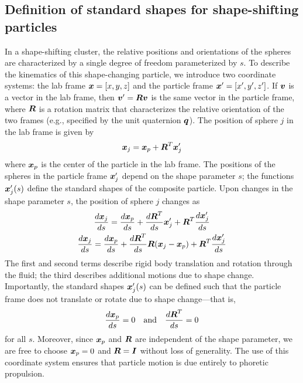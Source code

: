 \begin{appendices}
\clearpage
\section{Definition of standard shapes for shape-shifting particles}

In a shape-shifting cluster, the relative positions and orientations of the spheres are characterized by a single degree of freedom parameterized by $s$. To describe the kinematics of this shape-changing particle, we introduce two coordinate systems: the lab frame $\boldsymbol{x}=[x,y,z]$ and the particle frame $\boldsymbol{x}'=[x',y',z']$.  If $\boldsymbol{v}$ is a vector in the lab frame, then $\boldsymbol{v}'=\boldsymbol{R}\boldsymbol{v}$ is the same vector in the particle frame, where $\boldsymbol{R}$ is a rotation matrix that characterizes the relative orientation of the two frames (e.g., specified by the unit quaternion $\boldsymbol{q}$).  The position of sphere $j$ in the lab frame is given by 
\begin{equation}
    \boldsymbol{x}_j = \boldsymbol{x}_p + \boldsymbol{R}^T\boldsymbol{x}'_j
\end{equation}
where $\boldsymbol{x}_p$ is the center of the particle in the lab frame.  The positions of the spheres in the particle frame $\boldsymbol{x}'_j$ depend on the shape parameter $s$; the functions $\boldsymbol{x}'_j(s)$ define the standard shapes of the composite particle.\autocite{Shapere1989} Upon changes in the shape parameter $s$, the position of sphere $j$ changes as 
\begin{gather}
    \frac{d\boldsymbol{x}_j}{d s} = \frac{d \boldsymbol{x}_p}{d s} + \frac{d\boldsymbol{R}^T}{d s}\boldsymbol{x}'_j + \boldsymbol{R}^T\frac{d \boldsymbol{x}'_j}{ds}
    \\
    \frac{d\boldsymbol{x}_j}{d s} = \frac{d \boldsymbol{x}_p}{d s} + \frac{d\boldsymbol{R}^T}{d s} \boldsymbol{R}(\boldsymbol{x}_j-\boldsymbol{x}_p) + \boldsymbol{R}^T\frac{d \boldsymbol{x}'_j}{ds}
\end{gather}
The first and second terms describe rigid body translation and rotation through the fluid; the third describes additional motions due to shape change. Importantly, the standard shapes $\boldsymbol{x}'_j(s)$ can be defined such that the particle frame does not translate or rotate due to shape change---that is,
\begin{equation}
    \frac{d \boldsymbol{x}_p}{d s} = 0 \quad \text{and} \quad \frac{d\boldsymbol{R}^T}{d s} = 0
\end{equation}
for all $s$.  Moreover, since $\boldsymbol{x}_p$ and $\boldsymbol{R}$ are independent of the shape parameter, we are free to choose $\boldsymbol{x}_p=0$ and $\boldsymbol{R}=\boldsymbol{I}$ without loss of generality.  The use of this coordinate system ensures that particle motion is due entirely to phoretic propulsion.


\end{appendices}
